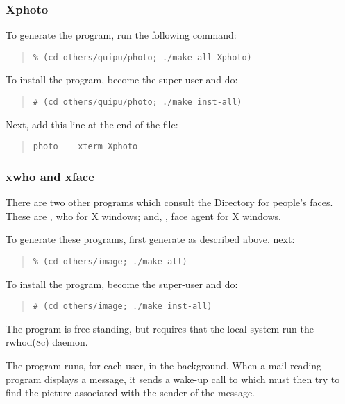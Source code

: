 \subsubsection	{Xphoto}
To generate the  program,
run the following command:
\begin{quote}\small\begin{verbatim}
% (cd others/quipu/photo; ./make all Xphoto)
\end{verbatim}\end{quote}
To install the program,
become the super-user and do:
\begin{quote}\small\begin{verbatim}
# (cd others/quipu/photo; ./make inst-all)
\end{verbatim}\end{quote}
Next,
add this line at the end of the  file:
\begin{quote}\small\begin{verbatim}
photo    xterm Xphoto
\end{verbatim}\end{quote}

\subsubsection	{xwho and xface}
There are two other programs which consult the Directory for people's faces.
These are , who for X windows;
and,
, face agent for X windows.

To generate these programs,
first generate  as described above.
next:
\begin{quote}\small\begin{verbatim}
% (cd others/image; ./make all)
\end{verbatim}\end{quote}
To install the program,
become the super-user and do:
\begin{quote}\small\begin{verbatim}
# (cd others/image; ./make inst-all)
\end{verbatim}\end{quote}

The  program is free-standing,
but requires that the local system run the \man rwhod(8c) daemon.

The  program runs, for each user, in the background.
When a mail reading program displays a message,
it sends a wake-up call to  which must then try to find the picture
associated with the sender of the message.


